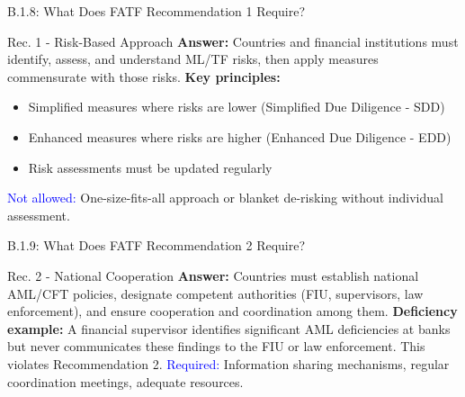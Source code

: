 \documentclass{beamer}
\begin{document}
	\begin{frame}{B.1.8: What Does FATF Recommendation 1 Require?}
		\begin{block}{Rec. 1 - Risk-Based Approach}
			\textbf{Answer:} Countries and financial institutions must identify, assess, and understand ML/TF risks, then apply measures commensurate with those risks.
			\vspace{0.2cm}
			\textbf{Key principles:}
			\begin{itemize}
				\item Simplified measures where risks are lower (Simplified Due Diligence - SDD)
				\item Enhanced measures where risks are higher (Enhanced Due Diligence - EDD)
				\item Risk assessments must be updated regularly
			\end{itemize}
			\textcolor{blue}{Not allowed:} One-size-fits-all approach or blanket de-risking without individual assessment.
		\end{block}
	\end{frame}
	
	\begin{frame}{B.1.9: What Does FATF Recommendation 2 Require?}
		\begin{block}{Rec. 2 - National Cooperation}
			\textbf{Answer:} Countries must establish national AML/CFT policies, designate competent authorities (FIU, supervisors, law enforcement), and ensure cooperation and coordination among them.
			\vspace{0.2cm}
			\textbf{Deficiency example:} A financial supervisor identifies significant AML deficiencies at banks but never communicates these findings to the FIU or law enforcement. This violates Recommendation 2.
			\vspace{0.2cm}
			\textcolor{blue}{Required:} Information sharing mechanisms, regular coordination meetings, adequate resources.
		\end{block}
	\end{frame}
	
\end{document}
